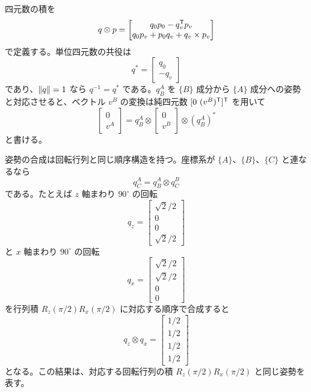 四元数の積を
\begin{equation}
  q\otimes p
  =
  \begin{bmatrix}
    q_0p_0-q_v^{\mathsf{T}} p_v\\
    q_0p_v+p_0q_v+q_v\times p_v
  \end{bmatrix}
\end{equation}
で定義する。単位四元数の共役は
\begin{equation}
  q^*=
  \begin{bmatrix}
    q_0\\ -q_v
  \end{bmatrix}
\end{equation}
であり、$\left\|q\right\|=1$ なら $q^{-1}=q^*$ である。$q^A_B$ を $\{B\}$ 成分から $\{A\}$ 成分への姿勢と対応させると、ベクトル $v^B$ の変換は純四元数 $[0\ (v^B)^{\mathsf{T}}]^{\mathsf{T}}$ を用いて
\begin{equation}
  \begin{bmatrix}
    0\\ v^A
  \end{bmatrix}
  =
  q^A_B\otimes
  \begin{bmatrix}
    0\\ v^B
  \end{bmatrix}
  \otimes(q^A_B)^*
\end{equation}
と書ける。

姿勢の合成は回転行列と同じ順序構造を持つ。座標系が $\{A\}$、$\{B\}$、$\{C\}$ と連なるなら
\begin{equation}
  q^A_C=q^A_B\otimes q^B_C
\end{equation}
である。たとえば $z$ 軸まわり $90^\circ$ の回転
\begin{equation}
  q_z=
  \begin{bmatrix}
    \sqrt{2}/2\\0\\0\\\sqrt{2}/2
  \end{bmatrix}
\end{equation}
と $x$ 軸まわり $90^\circ$ の回転
\begin{equation}
  q_x=
  \begin{bmatrix}
    \sqrt{2}/2\\\sqrt{2}/2\\0\\0
  \end{bmatrix}
\end{equation}
を行列積 $R_z(\pi/2)R_x(\pi/2)$ に対応する順序で合成すると
\begin{equation}
  q_z\otimes q_x
  =
  \begin{bmatrix}
    1/2\\1/2\\1/2\\1/2
  \end{bmatrix}
\end{equation}
となる。この結果は、対応する回転行列の積 $R_z(\pi/2)R_x(\pi/2)$ と同じ姿勢を表す。

